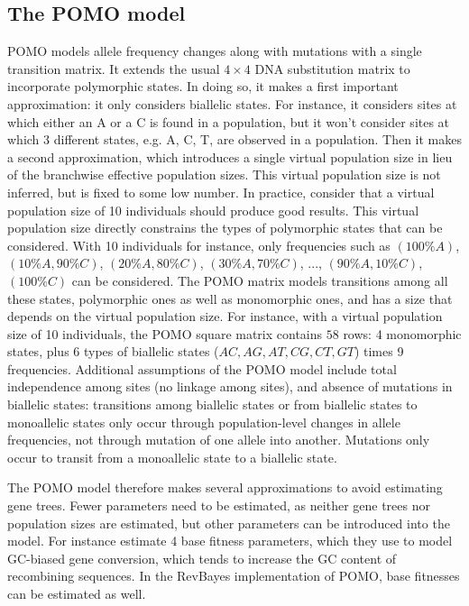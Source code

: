 \documentclass[11pt]{article}
\begin{document}
\subsection{The POMO model}
POMO models allele frequency changes along with mutations with a single transition matrix.
It extends the usual $4\times4$ DNA substitution matrix to incorporate polymorphic states.
In doing so, it makes a first important approximation: it only considers biallelic states.
For instance, it considers sites at which either an A or a C is found in a population, but it won't consider sites at which 3 different states, e.g. A, C, T, are observed in a population.
Then it makes a second approximation, which introduces a single virtual population size in lieu of the branchwise effective population sizes.
This virtual population size is not inferred, but is fixed to some low number.
In practice, \citet{DeMaio2013} consider that a virtual population size of 10 individuals should produce good results.
This virtual population size directly constrains the types of polymorphic states that can be considered.
With 10 individuals for instance, only frequencies such as $(100\%A)$, $(10\%A, 90\%C)$, $(20\%A, 80\%C)$, $(30\%A, 70\%C)$, ..., $(90\%A, 10\%C)$, $(100\%C)$ can be considered.
The POMO matrix models transitions among all these states, polymorphic ones as well as monomorphic ones, and has a size that depends on the virtual population size.
For instance, with a virtual population size of 10 individuals, the POMO square matrix contains $58$ rows: 4 monomorphic states, plus 6 types of biallelic states ($AC, AG, AT, CG, CT, GT$) times 9 frequencies.
Additional assumptions of the POMO model include total independence among sites (no linkage among sites), and absence of mutations in biallelic states: transitions among biallelic states or from biallelic states to monoallelic states only occur through population-level changes in allele frequencies, not through mutation of one allele into another.
Mutations only occur to transit from a monoallelic state to a biallelic state.

The POMO model therefore makes several approximations to avoid estimating gene trees.
Fewer parameters need to be estimated, as neither gene trees nor population sizes are estimated, but other parameters can be introduced into the model.
For instance \citet{DeMaio2013} estimate 4 base fitness parameters, which they use to model GC-biased gene conversion, which tends to increase the GC content of recombining sequences.
In the RevBayes implementation of POMO, base fitnesses can be estimated as well.
\end{document}
